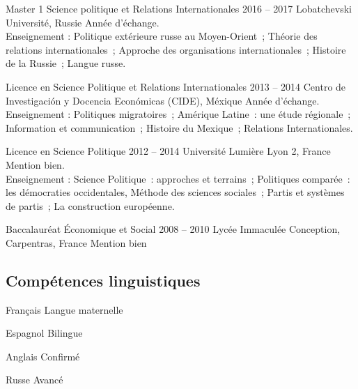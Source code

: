 \documentclass[30pt, french]{tccv}
\begin{document}
\begin{upshape}
\begin{education}
\vspace{0.5cm}
\item[Master 1 Science politique et Relations Internationales]{2016 -- 2017}
     {Lobatchevski Université, Russie}
     {     
     Année d’échange.\\
     \sloppy
     Enseignement : Politique extérieure russe au Moyen-Orient ; 
     Théorie des relations internationales ; 
     Approche des organisations internationales ; 
     Histoire de la Russie ; 
     Langue russe.
     }
     
   


\vspace{0.5cm}
\item[Licence en Science Politique et Relations Internationales]{2013 -- 2014}
     {Centro de Investigación y Docencia Económicas (CIDE), Méxique}
     {Année d’échange.\\
     Enseignement : Politiques migratoires ; Amérique Latine : une étude régionale ; Information et communication ; Histoire du Mexique ; Relations Internationales.
     }

     
\vspace{0.5cm}    
\item[Licence en Science Politique ]{2012 -- 2014}
     {Université Lumière Lyon 2, France}
     {Mention bien.\\
     Enseignement : Science Politique : approches et terrains ; Politiques comparée : les démocraties occidentales, Méthode des sciences sociales ; Partis et systèmes de partis ; La construction européenne. 
     }

     
\vspace{0.5cm}
\item[Baccalauréat Économique et Social]{2008 -- 2010}
     {Lycée Immaculée Conception, Carpentras, France}
     {Mention bien}


\end{education}


%
%


\begin{competence}


\section{Compétences linguistiques}
\fontsize{15pt}{1.6em}\color{text}\bodyfontlight\upshape\selectfont %
\begin{factlist}
\item{Français} {Langue maternelle}	
\item{Espagnol} {Bilingue}	
\item{Anglais} {Confirmé}	
\item{Russe} {Avancé}
\end{factlist}


\end{competence}
\end{upshape}
\end{document}
